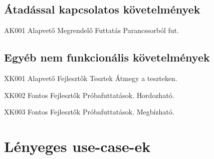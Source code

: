 \subsection{Átadással kapcsolatos követelmények}
\begin{kovetelmeny}
    {AK001} %
    {Alapvető} %
    {Megrendelő} %
    {Futtatás} %
    {Parancssorból fut.} %
\end{kovetelmeny}

\subsection{Egyéb nem funkcionális követelmények}
\begin{kovetelmeny}
    {XK001} %
    {Alapvető} %
    {Fejlesztők} %
    {Tesztek} %
    {Átmegy a teszteken.} %
\end{kovetelmeny}
\begin{kovetelmeny}
    {XK002} %
    {Fontos} %
    {Fejlesztők} %
    {Próbafuttatások.} %
    {Hordozható.} %
\end{kovetelmeny}
\begin{kovetelmeny}
    {XK003} %
    {Fontos} %
    {Fejlesztők} %
    {Próbafuttatások.} %
    {Megbízható.} %
\end{kovetelmeny}

\section{Lényeges use-case-ek}

